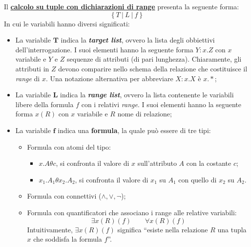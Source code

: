 \documentclass[a4paper]{article}
\newcommand{\dquotes}[1]{``#1''}
\begin{document}
	Il \textcolor{Red3}{\textbf{\underline{calcolo su tuple con dichiarazioni di range}}} presenta la seguente forma:
	\begin{equation*}
		\left\{T \: | \: L \: | \: f\right\}
	\end{equation*}
	In cui le variabili hanno diversi significati:
	\begin{itemize}
		\item La variabile $\boldsymbol{T}$ indica la \textbf{\emph{target list}}, ovvero la lista degli obbiettivi dell'interrogazione. I suoi elementi hanno la seguente forma $Y: x.Z$ con $x$ variabile e $Y$ e $Z$ sequenze di attributi (di pari lunghezza). Chiaramente, gli attributi in $Z$ devono comparire nello schema della relazione che costituisce il \emph{range} di $x$.\newline
		Una notazione alternativa per abbreviare $X: x.X$ è $x.*$;
		
		\item La variabile $\boldsymbol{L}$ indica la \textbf{\emph{range list}}, ovvero la lista contenente le variabili libere della formula $f$ con i relativi \emph{range}. I suoi elementi hanno la seguente forma $x\left(R\right)$ con $x$ variabile e $R$ nome di relazione;
		
		\item La variabile $\boldsymbol{f}$ indica una \textbf{formula}, la quale può essere di tre tipi:
		\begin{itemize}
			\item Formula con atomi del tipo:
			\begin{itemize}
				\item $x.A\theta c$, si confronta il valore di $x$ sull'attributo $A$ con la costante $c$;
				\item $x_{1}.A_{1}\theta x_{2}.A_{2}$, si confronta il valore di $x_{1}$ su $A_{1}$ con quello di $x_{2}$ su $A_{2}$.
			\end{itemize}
			
			\item Formula con connettivi ($\land, \lor, \lnot$);
			
			\item Formula con quantificatori che associano i range alle relative variabili:
			\begin{equation*}
				\exists x\left(R\right)\left(f\right) \hspace{2em} \forall x\left(R\right)\left(f\right)
			\end{equation*}
			Intuitivamente, $\exists x\left(R\right)\left(f\right)$ significa \dquotes{esiste nella relazione $R$ una tupla $x$ che soddisfa la formula $f$}.
		\end{itemize}
	\end{itemize}\newpage
	
\end{document}
